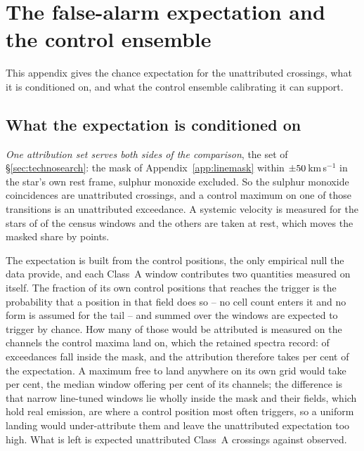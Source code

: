 \section{The false-alarm expectation and the control ensemble}
\label{app:falsealarm}

This appendix gives the chance expectation for the unattributed crossings,
what it is conditioned on, and what the control ensemble calibrating it can
support.

\subsection{What the expectation is conditioned on}

\emph{One attribution set serves both sides of the comparison}, the set of
\S\ref{sec:technosearch}: the mask of Appendix~\ref{app:linemask} within
$\pm50$\,km\,s$^{-1}$ in the star's own rest frame, sulphur monoxide
excluded. So the \MkNSODecide{} sulphur monoxide coincidences are unattributed
crossings, and a control maximum on one of those transitions is an
unattributed exceedance. A systemic velocity is measured for the stars of
\CeNVsys{} of the census windows and the others are taken at rest, which moves
the masked share by \CeVsysSensPct{} points.

The expectation is built from the control positions, the only empirical null
the data provide, and each Class~A window contributes two quantities
measured on itself. The fraction of its own \NCtrl{} control positions that
reaches the trigger is the probability that a position in that field does so
-- no cell count enters it and no form is assumed for the tail -- and
summed over the windows \CeExpTrig{} are expected to trigger by chance. How
many of those would be attributed is measured on the channels the control
maxima land on, which the retained spectra record: \CeNExcAttr{} of
\CeNExc{} exceedances fall inside the mask, and the attribution therefore
takes \CeMaskPct{} per cent of the expectation. A maximum free to land
anywhere on its own grid would take \CeUnifPct{} per cent, the median window
offering \CeMaskPctMed{} per cent of its channels; the difference is that
\CeNFullMask{} narrow line-tuned windows lie wholly inside the mask and
their fields, which hold real emission, are where a control position most
often triggers, so a uniform landing would under-attribute them and leave
the unattributed expectation too high. What is
left is \CeExp{} expected unattributed Class~A crossings against \CeObs{}
observed.

